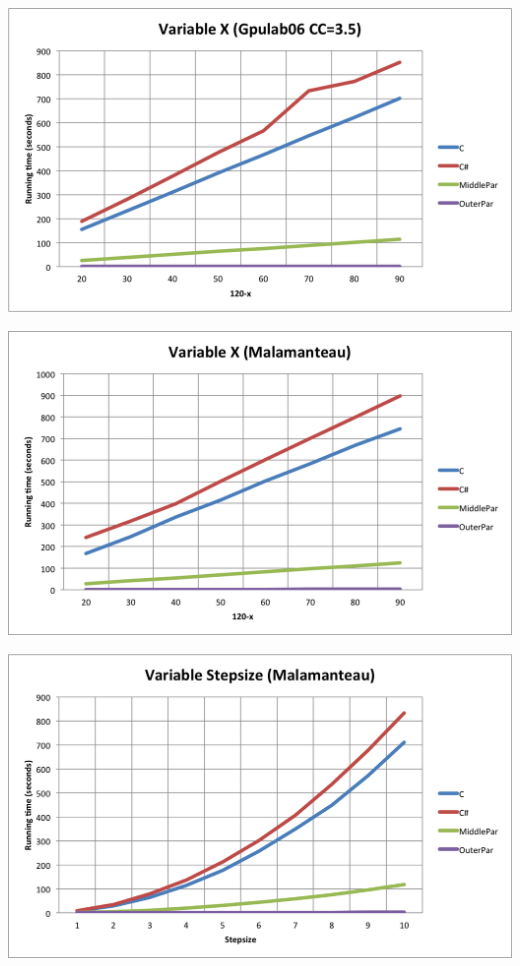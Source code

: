 \centerline{\includegraphics[width=\textwidth]{img/Gpulab-varx35.png}}

\centerline{\includegraphics[width=\textwidth]{img/Malamanteau-varx.png}}

\centerline{\includegraphics[width=\textwidth]{img/Malamanteau-stepsize.png}}

